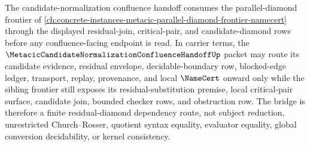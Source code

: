 The candidate-normalization confluence handoff consumes the parallel-diamond frontier of \autoref{ch:concrete-instances-metacic-parallel-diamond-frontier-namecert} through the displayed residual-join, critical-pair, and candidate-diamond rows before any confluence-facing endpoint is read. In carrier terms, the $\MetacicCandidateNormalizationConfluenceHandoffUp$ packet may route its candidate evidence, residual envelope, decidable-boundary row, blocked-edge ledger, transport, replay, provenance, and local $\NameCert$ onward only while the sibling frontier still exposes its residual-substitution premise, local critical-pair surface, candidate join, bounded checker rows, and obstruction row. The bridge is therefore a finite residual-diamond dependency route, not subject reduction, unrestricted Church--Rosser, quotient syntax equality, evaluator equality, global conversion decidability, or kernel consistency.
